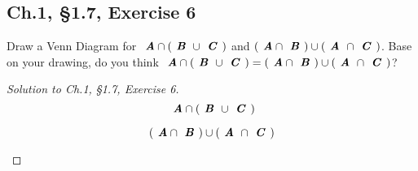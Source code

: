 \documentclass[12pt]{amsart}
\numberwithin{equation}{section}
\theoremstyle{definition}
\theoremstyle{remark}
\begin{document}
\subsection*{Ch.1, \S 1.7,  Exercise 6}  Draw a Venn Diagram for $ \textbf{ \textit{A}} \cap ( \textbf{ \textit{B} }  \cup \textbf{ \textit{C} } ) $ and $ ( \textbf{ \textit{A}} \cap \textbf{ \textit{B} } ) \cup ( \textbf{ \textit{A} } \cap \textbf{ \textit{C} } ) $. Base on your drawing, do you think $ \textbf{ \textit{A}} \cap ( \textbf{ \textit{B} }  \cup \textbf{ \textit{C} } ) = ( \textbf{ \textit{A}} \cap \textbf{ \textit{B} } ) \cup ( \textbf{ \textit{A} } \cap \textbf{ \textit{C} } ) $?

\begin{proof}[Solution to Ch.1, \S 1.7,  Exercise 6] \ \\
$$
\textbf{ \textit{A}} \cap ( \textbf{ \textit{B} }  \cup \textbf{ \textit{C} } )
$$

\begin{center}

\def\firstcircle{(0,0) circle (1.5cm)}
\def\secondcircle{(45:2cm) circle (1.5cm)}
\def\thirdcircle{(0:2cm) circle (1.5cm)}

\end{center}

$$
( \textbf{ \textit{A}} \cap \textbf{ \textit{B} } ) \cup ( \textbf{ \textit{A} } \cap \textbf{ \textit{C} } )
$$

\begin{center}

\def\firstcircle{(0,0) circle (1.5cm)}
\def\secondcircle{(45:2cm) circle (1.5cm)}
\def\thirdcircle{(0:2cm) circle (1.5cm)}

\end{center}

\end{proof}
\end{document}
